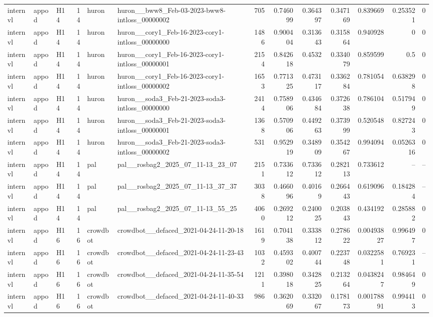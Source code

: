 \begin{longtable}{lllrllrrrrrrr}
internvl & appod & H14 & 14 & huron & huron\_\_bww8\_Feb-03-2023-bww8-intloss\_00000002 & 705 & 0.746099 & 0.364397 & 0.347169 & 0.839669 & 0.253521 & 0 \\
internvl & appod & H14 & 14 & huron & huron\_\_cory1\_Feb-16-2023-cory1-intloss\_00000000 & 1486 & 0.900404 & 0.313643 & 0.315864 & 0.940928 & 0 & 0 \\
internvl & appod & H14 & 14 & huron & huron\_\_cory1\_Feb-16-2023-cory1-intloss\_00000001 & 2154 & 0.842618 & 0.4532 & 0.334079 & 0.859599 & 0.5 & 0 \\
internvl & appod & H14 & 14 & huron & huron\_\_cory1\_Feb-16-2023-cory1-intloss\_00000002 & 1653 & 0.771325 & 0.473117 & 0.336284 & 0.781054 & 0.638298 & 0 \\
internvl & appod & H14 & 14 & huron & huron\_\_soda3\_Feb-21-2023-soda3-intloss\_00000000 & 2414 & 0.758906 & 0.434684 & 0.372638 & 0.786104 & 0.517949 & 0 \\
internvl & appod & H14 & 14 & huron & huron\_\_soda3\_Feb-21-2023-soda3-intloss\_00000001 & 1368 & 0.570906 & 0.449263 & 0.373999 & 0.520548 & 0.827243 & 0 \\
internvl & appod & H14 & 14 & huron & huron\_\_soda3\_Feb-21-2023-soda3-intloss\_00000002 & 531 & 0.952919 & 0.348909 & 0.354267 & 0.994094 & 0.0526316 & 0 \\
internvl & appod & H14 & 14 & pal & pal\_\_rosbag2\_2025\_07\_11-13\_23\_07 & 2151 & 0.733612 & 0.733612 & 0.282113 & 0.733612 & -- & -- \\
internvl & appod & H14 & 14 & pal & pal\_\_rosbag2\_2025\_07\_11-13\_37\_37 & 3038 & 0.466096 & 0.40169 & 0.266443 & 0.619096 & 0.184284 & -- \\
internvl & appod & H14 & 14 & pal & pal\_\_rosbag2\_2025\_07\_11-13\_55\_25 & 4060 & 0.269212 & 0.240025 & 0.203843 & 0.434192 & 0.285882 & 0 \\
internvl & appod & H16 & 16 & crowdbot & crowdbot\_\_defaced\_2021-04-24-11-20-18 & 1619 & 0.704138 & 0.333812 & 0.278622 & 0.00493827 & 0.996497 & 0 \\
internvl & appod & H16 & 16 & crowdbot & crowdbot\_\_defaced\_2021-04-24-11-23-43 & 1032 & 0.459302 & 0.400744 & 0.223748 & 0.0322581 & 0.769231 & -- \\
internvl & appod & H16 & 16 & crowdbot & crowdbot\_\_defaced\_2021-04-24-11-35-54 & 1211 & 0.398018 & 0.342825 & 0.213264 & 0.0438247 & 0.984649 & 0 \\
internvl & appod & H16 & 16 & crowdbot & crowdbot\_\_defaced\_2021-04-24-11-40-33 & 986 & 0.362069 & 0.332067 & 0.178173 & 0.00178891 & 0.994413 & 0 \\

\end{longtable}
